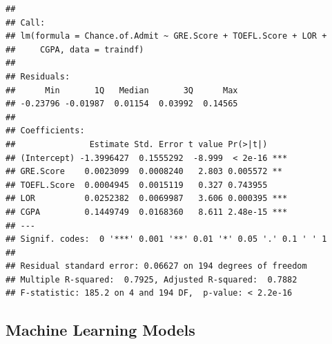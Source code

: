 \documentclass[11pt,]{article}
\newenvironment{Shaded}{\begin{snugshade}}{\end{snugshade}}
\newcommand{\DataTypeTok}[1]{\textcolor[rgb]{0.13,0.29,0.53}{#1}}
\newcommand{\DecValTok}[1]{\textcolor[rgb]{0.00,0.00,0.81}{#1}}
\newcommand{\KeywordTok}[1]{\textcolor[rgb]{0.13,0.29,0.53}{\textbf{#1}}}
\newcommand{\NormalTok}[1]{#1}
\newcommand{\OperatorTok}[1]{\textcolor[rgb]{0.81,0.36,0.00}{\textbf{#1}}}
\newcommand{\StringTok}[1]{\textcolor[rgb]{0.31,0.60,0.02}{#1}}
\begin{document}
\begin{verbatim}
## 
## Call:
## lm(formula = Chance.of.Admit ~ GRE.Score + TOEFL.Score + LOR + 
##     CGPA, data = traindf)
## 
## Residuals:
##      Min       1Q   Median       3Q      Max 
## -0.23796 -0.01987  0.01154  0.03992  0.14565 
## 
## Coefficients:
##               Estimate Std. Error t value Pr(>|t|)    
## (Intercept) -1.3996427  0.1555292  -8.999  < 2e-16 ***
## GRE.Score    0.0023099  0.0008240   2.803 0.005572 ** 
## TOEFL.Score  0.0004945  0.0015119   0.327 0.743955    
## LOR          0.0252382  0.0069987   3.606 0.000395 ***
## CGPA         0.1449749  0.0168360   8.611 2.48e-15 ***
## ---
## Signif. codes:  0 '***' 0.001 '**' 0.01 '*' 0.05 '.' 0.1 ' ' 1
## 
## Residual standard error: 0.06627 on 194 degrees of freedom
## Multiple R-squared:  0.7925, Adjusted R-squared:  0.7882 
## F-statistic: 185.2 on 4 and 194 DF,  p-value: < 2.2e-16
\end{verbatim}

\hypertarget{machine-learning-models}{%
\subsection{Machine Learning Models}\label{machine-learning-models}}

\begin{Shaded}
\end{Shaded}
\end{document}
